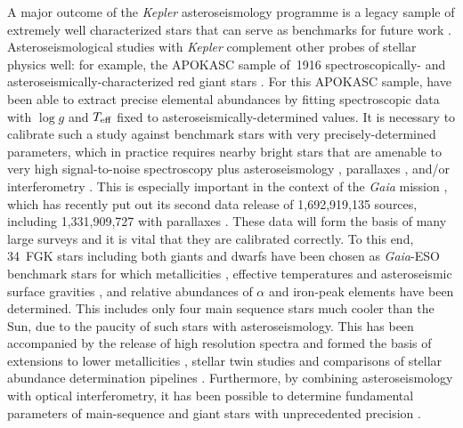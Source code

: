 \documentclass[a4paper,fleqn,usenatbib]{mnras}
\newcommand{\teff}{\mbox{$T_{\rm eff}$}\xspace}
\newcommand{\logg}{\mbox{$\log g$}\xspace}
\newcommand{\kepler}{\emph{Kepler}\xspace}
\newcommand{\gaia}{\emph{Gaia}\xspace}
\begin{document}
A major outcome of the \kepler asteroseismology programme is a legacy sample of extremely well characterized stars that can serve as benchmarks for future work \citep{keplerlegacy1,keplerlegacy2}. Asteroseismological studies with \kepler complement other probes of stellar physics well: for example, the APOKASC sample of~1916 spectroscopically- and asteroseismically-characterized red giant stars \citep{2014ApJS..215...19P}. For this APOKASC sample, \citet{hawkinsapogee} have been able to extract precise elemental abundances by fitting spectroscopic data with \logg and \teff fixed to asteroseismically-determined values. It is necessary to calibrate such a study against benchmark stars with very precisely-determined parameters, which in practice requires nearby bright stars that are amenable to very high signal-to-noise spectroscopy plus asteroseismology \citep{creeveybenchmark}, parallaxes \citep{hawkinsbenchmarks}, and/or interferometry \citep{casagrandebenchmark,creeveybenchmark2}. This is especially important in the context of the \gaia mission \citep{gaia}, which has recently put out its second data release of 1,692,919,135 sources, including 1,331,909,727 with parallaxes \citep{gaiadr2}. These data will form the basis of many large surveys and it is vital that they are calibrated correctly. To this end, 34~FGK stars including both giants and dwarfs have been chosen as \gaia-ESO benchmark stars for which metallicities \citep{gaiabenchmark1}, effective temperatures and asteroseismic surface gravities \citep{gaiabenchmark3}, and relative abundances of $\alpha$ and iron-peak elements \citep{gaiabenchmark4} have been determined. This includes only four main sequence stars much cooler than the Sun, due to the paucity of such stars with asteroseismology. This has been accompanied by the release of high resolution spectra \citep{gaiabenchmark2} and formed the basis of extensions to lower metallicities \citep{gaiabenchmark5}, stellar twin studies \citep{gaiabenchmarktwins} and comparisons of stellar abundance determination pipelines \citep{gaiabenchmarkabundances}. Furthermore, by combining asteroseismology with optical interferometry, it has been possible to determine fundamental parameters of main-sequence and giant stars with unprecedented precision \citep{huber12,thetacygwhite,white15}. 
\end{document}
